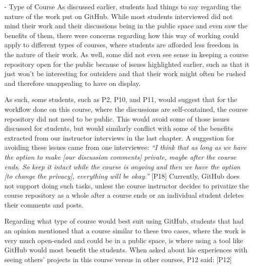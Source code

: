 - Type of Course
As discussed earlier, students had things to say regarding the nature of the work put on GitHub. While most students interviewed did not mind their work and their discussions being in the public space and even saw the benefits of them, there were concerns regarding how this way of working could apply to different types of courses, where students are afforded less freedom in the nature of their work. As well, some did not even see sense in keeping a course repository open for the public because of issues highlighted earlier, such as that it just won't be interesting for outsiders and that their work might often be rushed and therefore unappealing to have on display.

As such, some students, such as P2, P10, and P11, would suggest that for the workflow done on this course, where the discussions are self-contained, the course repository did not need to be public. This would avoid some of those issues discussed for students, but would similarly conflict with some of the benefits extracted from our instructor interviews in the last chapter. A suggestion for avoiding these issues came from one interviewee: \textit{``I think that as long as we have the option to make [our discussion comments] private, maybe after the course ends. So keep it intact while the course is ongoing and then we have the option [to change the privacy], everything will be okay.''} [P18] Currently, GitHub does not support doing such tasks, unless the course instructor decides to privatize the course repository as a whole after a course ends or an individual student deletes their comments and posts. %

Regarding what type of course would best suit using GitHub, students that had an opinion mentioned that a course similar to these two cases, where the work is very much open-ended and could be in a public space, is where using a tool like GitHub would most benefit the students. When asked about his experiences with seeing others' projects in this course versus in other courses, P12 said:  [P12]

